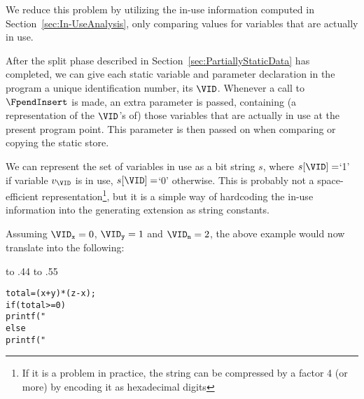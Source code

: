 \begin{docpart}
We reduce this problem by utilizing the in-use information computed in
Section~\ref{sec:In-UseAnalysis},  only comparing values for variables
that are actually in use.

After the split phase described in Section~\ref{sec:PartiallyStaticData}
has completed, we can give each static variable and parameter declaration
in the program a unique identification number, its $\VID$.
Whenever a call to $\FpendInsert$ is made, an extra parameter is passed,
containing (a representation of the $\VID$'s of) those variables that are
actually in use at the present program point. This parameter is then passed 
on when comparing or copying the static store.

We can represent the set of variables in use as a bit string $s$,
where $s[\VID] = $`1' if variable $v_{\VID}$ is in use, $s[\VID] = $`0'
otherwise. This is probably not a space-efficient
representation\footnote{If it is a problem in practice, the string can be
  compressed by a factor 4 (or more) by encoding it as hexadecimal digits},
but it is a simple way of hardcoding the in-use information into the
generating extension as string constants.

Assuming $\VID_{\mathtt{x}} = 0$, $\VID_{\mathtt{y}} = 1$ and
$\VID_{\mathtt{n}} = 2$, the above example would now translate into the
following:
\begin{center}\def\d{\(\sb{d}\)}\def\s{\(\sb{s}\)}%
\leavevmode\small
\hbox to .44\textwidth{\hss$p$\hss\hss}\hfil
\hbox to .55\textwidth{\hss$\Ppgen$\hss\hss}\nopagebreak[4]\smallskip
\nopagebreak[4]

\begin{minipage}[t]{.44\textwidth}\normalsize
\begin{alltt}
total = (x + y) * (z - x);
if (total >= 0)
  printf("%d: profit!  x=%d", n, x);
else 
  printf("%d: deficit!", n); 





\end{alltt}
\end{minipage}
\end{center}
\end{docpart}
